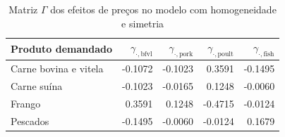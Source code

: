 
\begin{table}[H]
\centering
\caption{Matriz $\Gamma$ dos efeitos de preços no modelo com homogeneidade e simetria}
\label{tab:gamma-hsym}
\small
\begin{tabular}{@{}lrrrr@{}}
\toprule
Produto demandado & $\gamma_{\cdot,\text{bfvl}}$ & $\gamma_{\cdot,\text{pork}}$ & $\gamma_{\cdot,\text{poult}}$ & $\gamma_{\cdot,\text{fish}}$ \\
\midrule
Carne bovina e vitela & -0.1072 & -0.1023 & 0.3591 & -0.1495 \\
Carne suína & -0.1023 & -0.0165 & 0.1248 & -0.0060 \\
Frango & 0.3591 & 0.1248 & -0.4715 & -0.0124 \\
Pescados & -0.1495 & -0.0060 & -0.0124 & 0.1679 \\
\bottomrule
\end{tabular}
\end{table}
